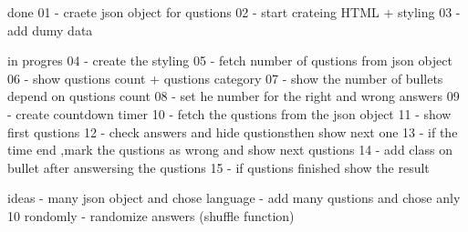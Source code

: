 done
01 - craete json object for qustions
02 - start crateing HTML + styling
03 - add dumy data

in progres
04 - create the styling
05 - fetch number of qustions from json object
06 - show qustions count + qustions category
07 - show the number of bullets depend on qustions count
08 - set he number for the right and wrong answers
09 - create countdown timer
10 - fetch the qustions from the json object
11 - show first qustions 
12 - check answers and hide qustionsthen show next one 
13 - if the  time end ,mark the qustions as wrong and show next qustions
14 - add class on bullet after answersing the qustions
15 - if qustions finished show the result 

ideas 
- many json object and chose language
- add many qustions and chose anly 10 rondomly 
- randomize answers (shuffle function)